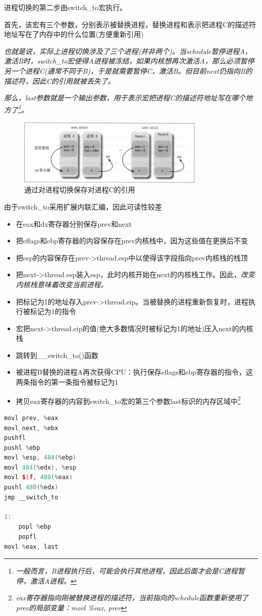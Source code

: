     进程切换的第二步由switch\_to宏执行。

    首先，该宏有三个参数，分别表示被替换进程，替换进程和表示把进程C的描述符地址写在了内存中的什么位置(方便重新引用)

    \emph{也就是说，实际上进程切换涉及了三个进程(并非两个)。当schedule暂停进程A，激活B时，switch\_to宏使得A进程被冻结，如果内核想再次激活A，那么必须暂停另一个进程C(通常不同于B)，于是就需要暂停C，激活B。但目前next仍指向B的描述符，因此C的引用就被丢失了。}

    \emph{那么，last参数就是一个输出参数，用于表示宏把进程C的描述符地址写在哪个地方了\footnote[1]{\emph{一般而言，B进程执行后，可能会执行其他进程，因此后面才会是C进程暂停，激活A进程。}}。}

\begin{figure}[!htbp]
    \centering
    \includegraphics[width=0.8\textwidth]{image/chapter03/通过对进程切换保存对进程C的引用.png}
    \caption{通过对进程切换保存对进程C的引用}
\end{figure}

    由于switch\_to采用扩展内联汇编，因此可读性较差

\begin{itemize}
    \item [1)] 在eax和dx寄存器分别保存prev和next
    \item [2)] 把eflags和ebp寄存器的内容保存在prev内核栈中，因为这些值在更换后不变
    \item [3)] 把esp的内容保存在prev->thread.esp中以使得该字段指向prev内核栈的栈顶
    \item [4)] 把next->thread.esp装入esp，此时内核开始在next的内核栈工作。因此，\emph{改变内核栈意味着改变当前进程。}
    \item [5)] 把标记为1的地址存入prev->thread.eip。当被替换的进程重新恢复时，进程执行被标记为1的指令
    \item [6)] 宏把next->thread.eip的值(绝大多数情况时被标记为1的地址)压入next的内核栈
    \item [7)] 跳转到\_\_switch\_to()函数
    \item [8)] 被进程B替换的进程A再次获得CPU：执行保存eflags和ebp寄存器的指令，这两条指令的第一条指令被标记为1
    \item [9)] 拷贝eax寄存器的内容到switch\_to宏的第三个参数last标识的内存区域中\footnote[1]{\emph{eax寄存器指向刚被替换进程的描述符，当前指向的schedule函数重新使用了prev的局部变量：movl \%eax, prev}}
\end{itemize}

\begin{lstlisting}[language=C++, caption={对于switch\_to的过程描述}]
movl prev, %eax
movl next, %ebx
pushfl
pushl %ebp
movl %esp, 484(%ebp)
movl 484(%edx), %esp
movl $1f, 480(%eax)
pushl 480(%edx)
jmp __switch_to

1: 
    popl %ebp
    popfl
movl %eax, last
\end{lstlisting}